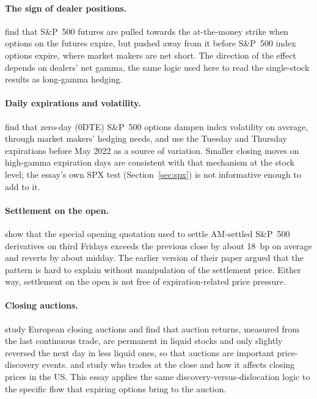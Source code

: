 \documentclass[11pt,a4paper]{article}
\begin{document}
\paragraph{The sign of dealer positions.} \citet{GolezJackwerth2012} find that S\&P~500 futures are pulled towards the at-the-money strike when options on the futures expire, but pushed away from it before S\&P~500 index options expire, where market makers are net short. The direction of the effect depends on dealers' net gamma, the same logic used here to read the single-stock results as long-gamma hedging.

\paragraph{Daily expirations and volatility.} \citet{Adams0DTE} find that zero-day (0DTE) S\&P~500 options dampen index volatility on average, through market makers' hedging needs, and use the Tuesday and Thursday expirations before May 2022 as a source of variation. Smaller closing moves on high-gamma expiration days are consistent with that mechanism at the stock level; the essay's own SPX test (Section~\ref{sec:spx}) is not informative enough to add to it.

\paragraph{Settlement on the open.} \citet{BaltussenTersteggeWhelan2024} show that the special opening quotation used to settle AM-settled S\&P~500 derivatives on third Fridays exceeds the previous close by about 18~bp on average and reverts by about midday. The earlier version of their paper argued that the pattern is hard to explain without manipulation of the settlement price. Either way, settlement on the open is not free of expiration-related price pressure.

\paragraph{Closing auctions.} \citet{ComertonFordeRindi2022} study European closing auctions and find that auction returns, measured from the last continuous trade, are permanent in liquid stocks and only slightly reversed the next day in less liquid ones, so that auctions are important price-discovery events. \citet{BogousslavskyMuravyev2023} and \citet{HuMurphy2026} study who trades at the close and how it affects closing prices in the US. This essay applies the same discovery-versus-dislocation logic to the specific flow that expiring options bring to the auction.
\end{document}
